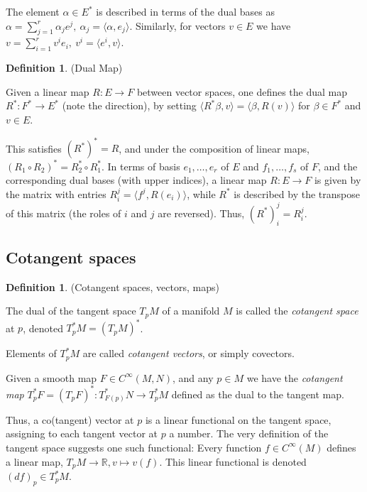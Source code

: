 \documentclass{article}
\theoremstyle{definition}
\newtheorem{defn}[theorem]{Definition}
\newenvironment{definition}
  {\vspace{8pt}\begin{mdframed}[backgroundcolor=blueish]\begin{defn}}
  {\end{defn}\end{mdframed}\vspace{4pt}}
\begin{document}
The element $\alpha \in E^*$ is described in terms of the dual bases as $\alpha = \sum_{j=1}^r \alpha_j e^j, \  \alpha_j = \langle \alpha, e_j \rangle$. Similarly, for vectors $v \in E$ we have $v = \sum_{i=1}^r v^i e_i, \ v^i = \langle e^i , v \rangle$.

\begin{definition} (Dual Map)

Given a linear map $R : E \rightarrow F$ between vector spaces, one defines the dual map $R^* : F^* \rightarrow E^*$ (note the direction), by setting $\langle R^* \beta, v \rangle = \langle \beta ,R(v)\rangle$ for $\beta \in F^*$ and $v \in E$. 
\end{definition}

This satisfies $(R^*)^* = R$, and under the composition of linear maps, $(R_1 \circ R_2)^* = R^*_2 \circ R^*_1$. In terms of basis $e_1,\dots, e_r$ of $E$ and $f_1,\dots, f_s$ of $F$, and the corresponding dual bases (with upper indices), a linear map $R : E \rightarrow F$ is given by the matrix with entries $R_i^j = \langle f^j , R(e_i)\rangle$, while $R^*$ is described by the transpose of this matrix (the roles of $i$ and $j$ are reversed). Thus, $(R^*)^j_i = R_i^j$.

\subsection{Cotangent spaces}

\begin{definition} (Cotangent spaces, vectors, maps)

The dual of the tangent space $T_pM$ of a manifold $M$ is called the \textit{cotangent space} at $p$, denoted $T^*_p M = (T_pM)^*$.

Elements of $T^*_p M$ are called \textit{cotangent vectors}, or simply covectors. 

Given a smooth map $F \in C^\infty(M, N)$, and any $p \in M$ we have the \textit{cotangent map} $T^*_p F = (T_pF)^* : T^*_{F(p)}N \rightarrow T^*_p M$ defined as the dual to the tangent map.

\end{definition}

Thus, a co(tangent) vector at $p$ is a linear functional on the tangent space, assigning to each tangent vector at $p$ a number. The very definition of the tangent space suggests one such functional: Every function $f \in C^\infty(M)$ defines a linear map, $T_pM \rightarrow \mathbb R, v \mapsto v(f)$. This linear functional is denoted $(d f)_p \in T^*_p M$.
\end{document}
